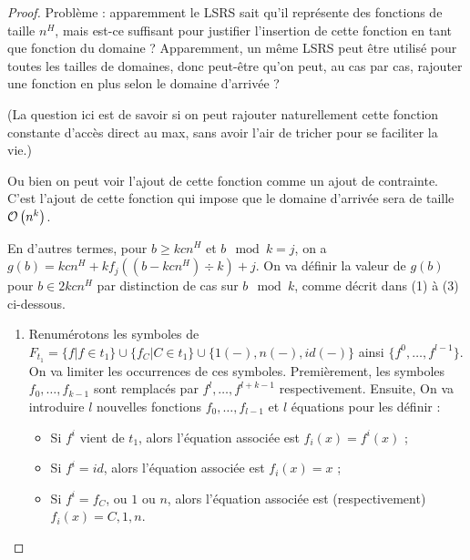 \documentclass{article}
\begin{document}
\begin{proof}
{\begin{minipage}{0.9\textwidth}
					Problème : apparemment le LSRS sait qu'il représente des fonctions de taille $n^H$, mais est-ce suffisant pour justifier l'insertion de cette fonction en tant que fonction du domaine ? Apparemment, un même LSRS peut être utilisé pour toutes les tailles de domaines, donc peut-être qu'on peut, au cas par cas, rajouter une fonction en plus selon le domaine d'arrivée ?
					
					(La question ici est de savoir si on peut rajouter naturellement cette fonction constante d'accès direct au max, sans avoir l'air de tricher pour se faciliter la vie.)
					
					Ou bien on peut voir l'ajout de cette fonction comme un ajout de contrainte. C'est l'ajout de cette fonction qui impose que le domaine d'arrivée sera de taille $\mathcal{O}\left( n^k \right)$.
				\end{minipage}
				}
				
				\espace
			
			
			En d'autres termes, pour $b \geqslant kcn^H$ et $b \mod{k} = j$, on a $g(b) = kcn^H + k f_j\left( (b-kcn^H) \div k \right) + j$.
			On va définir la valeur de $g(b)$ pour $b \in 2kcn^H$ par distinction de cas sur $b \mod{k}$, comme décrit dans (1) à (3) ci-dessous.
			
			\begin{enumerate}[itemsep=-1mm,leftmargin=2cm]
				\item  
					Renumérotons les symboles de $F_{t_1} = \{f | f \in t_1\} \cup \{f_C | C \in t_1\} \cup \{1(-), n(-), id(-)\}$ ainsi $\{ f^0, \dots, f^{l-1} \}$. On va limiter les occurrences de ces symboles. Premièrement, les symboles $f_0, \dots, f_{k-1}$ sont remplacés par $f^{l}, \dots, f^{l+k-1}$ respectivement. Ensuite, On va introduire $l$ nouvelles fonctions $f_0, \dots, f_{l-1}$ et $l$ équations pour les définir :
					
						\begin{itemize}[itemsep=-1mm,leftmargin=1cm]
							\item	Si $f^i$ vient de $t_1$, alors l'équation associée est $f_i(x) = f^i(x)$ ;
							\item 	Si $f^i = id$, alors l'équation associée est $f_i(x) = x$ ;
							\item 	Si $f^i = f_C$, ou $1$ ou $n$, alors l'équation associée est (respectivement) $f_i(x) = C, 1, n$. 
						\end{itemize}
				
					

\end{enumerate}
\end{proof}
\end{document}
